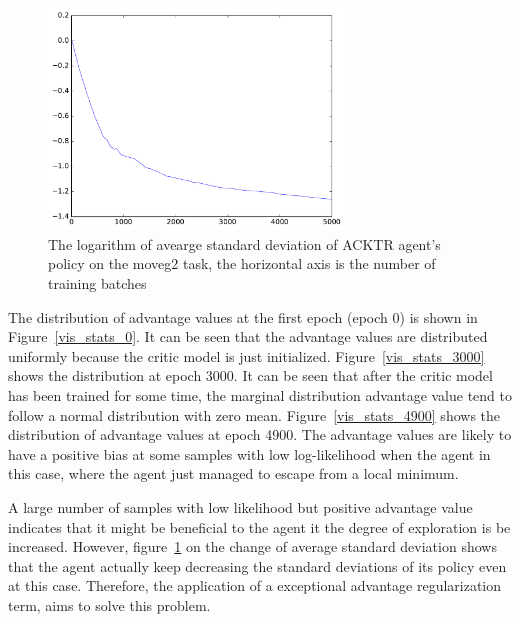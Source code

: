 \begin{figure}[!htbp]
	\includegraphics[width=0.7\textwidth]{images/rec_stat_moveg2_std.pdf}
	\centering
	\caption{The logarithm of avearge standard deviation of ACKTR agent's policy on the moveg2 task, the horizontal axis is the number of training batches}\label{rec_stat_moveg2_std}
\end{figure}
The distribution of advantage values at the first epoch (epoch 0) is shown in Figure~\ref{vis_stats_0}. It can be seen that the advantage values are distributed uniformly because the critic model is just initialized. Figure~\ref{vis_stats_3000} shows the distribution at epoch 3000. It can be seen that after the critic model has been trained for some time, the marginal distribution advantage value tend to follow a normal distribution with zero mean.  Figure~\ref{vis_stats_4900} shows the distribution of advantage values at epoch 4900. The advantage values are likely to have a positive bias at some samples with low log-likelihood  when the agent in this case, where the agent just managed to escape from a local minimum.  

A large number of samples with low likelihood but positive advantage value indicates that it might be beneficial to the agent it the degree of exploration is be increased. However, figure~\ref{rec_stat_moveg2_std} on the change of average standard deviation shows that the agent actually keep decreasing the standard deviations of its policy even at this case. Therefore, the application of a exceptional advantage regularization term, aims to solve this problem.

